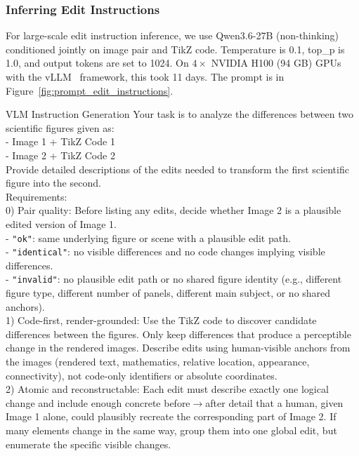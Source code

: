 \subsubsection{Inferring Edit Instructions}
\label{subsubsec:Inferring Edit Instructions}
For large-scale edit instruction inference, we use Qwen3.6-27B (non-thinking) conditioned jointly on image pair and TikZ code. Temperature is 0.1, top\_p is 1.0, and output tokens are set to 1024. On $4\times$ NVIDIA H100 (94 GB) GPUs with the vLLM~\citep{kwon2023efficient} framework, this took 11 days. The prompt is in Figure~\ref{fig:prompt_edit_instructions}.
\begin{PromptBox}{VLM Instruction Generation}
Your task is to analyze the differences between two scientific figures given as: \\
- Image 1 + TikZ Code 1 \\
- Image 2 + TikZ Code 2 \\
Provide detailed descriptions of the edits needed to transform the first scientific figure into the second. \\

Requirements: \\

0) Pair quality: Before listing any edits, decide whether Image 2 is a plausible edited version of Image 1. \\
- \texttt{"ok"}: same underlying figure or scene with a plausible edit path. \\
- \texttt{"identical"}: no visible differences and no code changes implying visible differences. \\
- \texttt{"invalid"}: no plausible edit path or no shared figure identity (e.g., different figure type, different number of panels, different main subject, or no shared anchors). \\

1) Code-first, render-grounded: Use the TikZ code to discover candidate differences between the figures. Only keep differences that produce a perceptible change in the rendered images. Describe edits using human-visible anchors from the images (rendered text, mathematics, relative location, appearance, connectivity), not code-only identifiers or absolute coordinates. \\

2) Atomic and reconstructable: Each edit must describe exactly one logical change and include enough concrete before$\rightarrow$after detail that a human, given Image 1 alone, could plausibly recreate the corresponding part of Image 2. If many elements change in the same way, group them into one global edit, but enumerate the specific visible changes. \\


\end{PromptBox}
